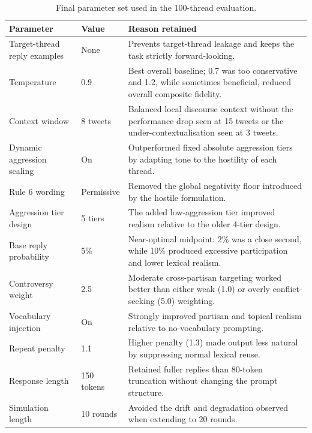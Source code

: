 \documentclass[logo,bsc,singlespacing,parskip,online]{infthesis}
\begin{document}
\begin{table}[ht]
\centering
\caption{Final parameter set used in the 100-thread evaluation.}
\label{tab:final_params}
\small
\begin{tabular}{p{}p{}p{}}
\toprule
\textbf{Parameter} & \textbf{Value} & \textbf{Reason retained} \\
\midrule
Target-thread reply examples & None & Prevents target-thread leakage and keeps the task strictly forward-looking. \\
Temperature & 0.9 & Best overall baseline; 0.7 was too conservative and 1.2, while sometimes beneficial, reduced overall composite fidelity. \\
Context window & 8 tweets & Balanced local discourse context without the performance drop seen at 15 tweets or the under-contextualisation seen at 3 tweets. \\
Dynamic aggression scaling & On & Outperformed fixed absolute aggression tiers by adapting tone to the hostility of each thread. \\
Rule 6 wording & Permissive & Removed the global negativity floor introduced by the hostile formulation. \\
Aggression tier design & 5 tiers & The added low-aggression tier improved realism relative to the older 4-tier design. \\
Base reply probability & 5\% & Near-optimal midpoint: 2\% was a close second, while 10\% produced excessive participation and lower lexical realism. \\
Controversy weight & 2.5 & Moderate cross-partisan targeting worked better than either weak (1.0) or overly conflict-seeking (5.0) weighting. \\
Vocabulary injection & On & Strongly improved partisan and topical realism relative to no-vocabulary prompting. \\
Repeat penalty & 1.1 & Higher penalty (1.3) made output less natural by suppressing normal lexical reuse. \\
Response length & 150 tokens & Retained fuller replies than 80-token truncation without changing the prompt structure. \\
Simulation length & 10 rounds & Avoided the drift and degradation observed when extending to 20 rounds. \\
\bottomrule
\end{tabular}
\end{table}

\end{document}
